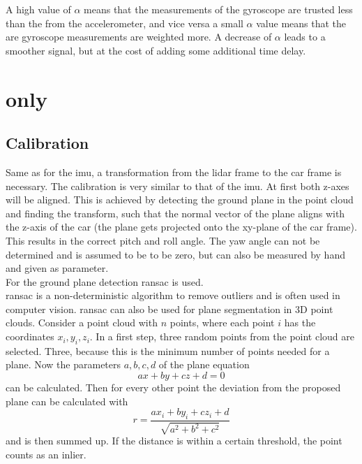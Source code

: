A high value of $\alpha$ means that the measurements of the gyroscope are trusted less than the from the accelerometer, and vice versa a small $\alpha$ value means that the are gyroscope measurements are weighted more.
A decrease of $\alpha$ leads to a smoother signal, but at the cost of adding some additional time delay.


\section{ only}
\subsection{Calibration}
Same as for the \gls{imu}, a transformation from the \gls{lidar} frame to the car frame is necessary.
The calibration is very similar to that of the \gls{imu}.
At first both z-axes will be aligned.
This is achieved by detecting the ground plane in the point cloud and finding the transform, such that the normal vector of the plane aligns with the z-axis of the car (the plane gets projected onto the xy-plane of the car frame).
This results in the correct pitch and roll angle.
The yaw angle can not be determined and is assumed to be to be zero, but can also be measured by hand and given as parameter.\\
For the ground plane detection \gls{ransac} \cite{Fischler1981} is used.\\
\gls{ransac} is a non-deterministic algorithm to remove outliers and is often used in computer vision.
\gls{ransac} can also be used for plane segmentation in 3D point clouds.
Consider a point cloud with $n$ points, where each point $i$ has the coordinates $x_i, y_i, z_i$.
In a first step, three random points from the point cloud are selected.
Three, because this is the minimum number of points needed for a plane.
Now the parameters $a, b, c, d$ of the plane equation
\begin{equation}
    ax + by + cz + d = 0
\end{equation}
can be calculated.
Then for every other point the deviation from the proposed plane can be calculated with
\begin{equation}
    r = \frac{ax_i + by_i + cz_i + d}{\sqrt{a^2 + b^2 + c^2}}
\end{equation}
and is then summed up.
If the distance is within a certain threshold, the point counts as an inlier.
